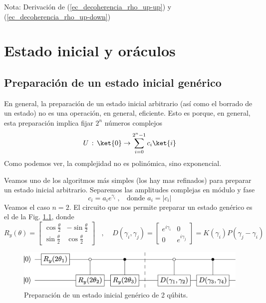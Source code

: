 \documentclass[a4paper,11pt]{book} %
\numberwithin{equation}{chapter}
\begin{document}
\begin{mybox_blue}{Nota: Derivación de (\ref{ec_decoherencia_rho_up-up}) y  (\ref{ec_decoherencia_rho_up-down})}
    


\chapter{Estado inicial y oráculos}


    \section{Preparación de un estado inicial genérico}

En general, la preparación de un estado inicial arbitrario (así como el borrado de un estado) no es una operación, en general, eficiente. Esto es porque, en general, esta preparación implica fijar $2^n$ números complejos
$$
U \, : \, \ket{0} \rightarrow \sum_{i=0}^{2^n-1} c_i \ket{i}
$$
Como podemos ver, la complejidad no es polinómica, sino exponencial. 

Veamos uno de los algoritmos más simples (los hay mas refinados) para preparar un estado inicial arbitrario. Separemos las amplitudes complejas en módulo y fase 
$$
c_i = a_i e^{\gamma_i} ~, ~~~~ \text{donde } a_i = |c_i|
$$
Veamos el caso $n=2$. El circuito que nos permite preparar un estado genérico es el de la Fig. \ref{Fig_InicialOracle_preparestatecircuit}, donde $$
R_y(\theta) = \begin{bmatrix} \cos\frac{\theta}{2} & -\sin\frac{\theta}{2} \\
 \sin\frac{\theta}{2}  & \cos\frac{\theta}{2} \end{bmatrix}~~~~, ~~~~~
D(\gamma_i,\gamma_j ) = \begin{bmatrix} e^{i\gamma_i} & 0 \\ 0 & e^{i\gamma_j} \end{bmatrix} = K(\gamma_i) P(\gamma_j-\gamma_i)
$$

	\begin{figure}[H]
	\centering 
	\includegraphics[width=0.65\linewidth]{Figuras/Fig_InicialOracle_preparestatecircuit}
	\caption{Preparación de un estado inicial genérico de 2 qúbits.}
	\label{Fig_InicialOracle_preparestatecircuit}
	\end{figure}


\end{mybox_blue}
\end{document}
